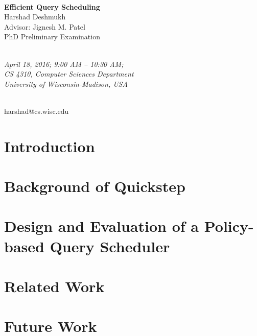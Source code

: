 \documentclass[11pt, oneside]{book}
\newcommand{\cchapter}[1]{\chapter[#1]{\centering #1}}
\begin{document}
\begin{centering}

\vspace*{10ex} \textbf{\LARGE{\\Efficient Query Scheduling}} \LARGE{\\Harshad 
Deshmukh\\Advisor: Jignesh M. Patel}
\LARGE{\\PhD Preliminary Examination}

\textit{\Large{\\April 18, 2016; 9:00 AM -- 10:30 AM;\\CS 4310, Computer
Sciences Department\\University of Wisconsin-Madison, USA}}

\textsf{\Large{\\harshad@cs.wisc.edu}}

\end{centering}

\normalsize

\tableofcontents

\cchapter {Introduction}


\cchapter {Background of Quickstep}


\cchapter {Design and Evaluation of a Policy-based Query Scheduler}






\cchapter{Related Work}


\cchapter {Future Work}


\begin{small}


\end{small}
\clearpage
\end{document}
